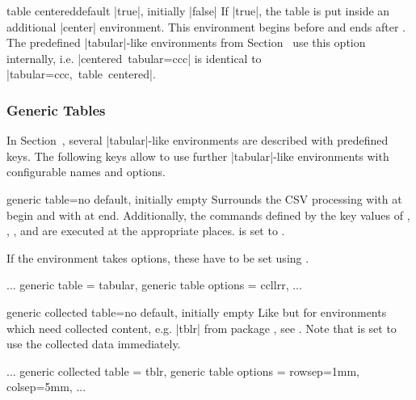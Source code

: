 \documentclass[a4paper,11pt]{ltxdoc}
\begin{document}
\begin{docCsvKey}[][doc new=2021-09-09]{table centered}{}{default |true|, initially |false|}
  If |true|, the table is put inside an additional |center| environment.
  This environment begins before 
  and ends after . The predefined |tabular|-like environments
  from Section~ use this option internally,
  i.e. \mbox{|centered tabular={ccc}|} is identical to
  \mbox{|tabular={ccc}, table centered|}.
\end{docCsvKey}


\clearpage
\subsubsection{Generic Tables}\label{subsubsec:table_generic}
In Section~, several |tabular|-like environments
are described with predefined keys. The following keys allow to use further
|tabular|-like environments with configurable names and options.


\begin{docCsvKey}[][doc new=2021-09-09]{generic table}{=}{no default, initially empty}
  Surrounds the CSV processing with 
  at begin and with  at end.
  Additionally, the commands defined by the key values of
  , , ,
  and  are executed at the appropriate places.
   is set to \cs{}\cs{}.\par
  If the environment  takes options, these have to be set using
  .

\begin{dispListing}
  ...
  generic table         = tabular,
  generic table options = {{ccllrr}},
  ...
\end{dispListing}
\end{docCsvKey}


\begin{docCsvKey}[][doc new=2021-09-09]{generic collected table}{=}{no default, initially empty}
  Like  but for environments which need
  collected content, e.g. |tblr| from package , see .
  Note that  is set to use the collected
  data immediately.

\begin{dispListing}
  ...
  generic collected table = tblr,
  generic table options   = {{rowsep=1mm, colsep=5mm}},
  ...
\end{dispListing}
\end{docCsvKey}
\end{document}
